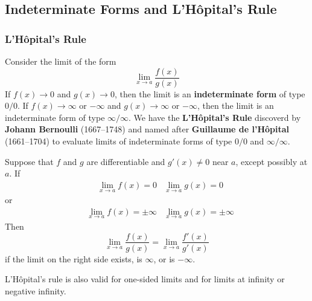 \subsection{Indeterminate Forms and L'Hôpital's Rule}
\subsubsection{L'Hôpital's Rule}
Consider the limit of the form \[\lim_{x\to a}\frac{f(x)}{g(x)}\]
If \(f(x)\to 0\) and \(g(x)\to 0\), then the limit is an
\textbf{indeterminate form} of type \(0/0\).
If \(f(x)\to\infty\) or \(-\infty\) and \(g(x)\to\infty\) or \(-\infty\),
then the limit is an indeterminate form of type \(\infty/\infty\).
We have the \textbf{L'Hôpital's Rule} discoverd by
\textbf{Johann Bernoulli} (1667--1748) and named after
\textbf{Guillaume de l'Hôpital} (1661--1704) to evaluate limits of indeterminate
forms of type \(0/0\) and \(\infty/\infty\).
\begin{theorem}
    Suppose that \(f\) and \(g\) are differentiable and \(g'(x)\neq 0\) near \(a\),
    except possibly at \(a\).
    If
    \begin{align*}
        &\lim_{x\to a}f(x)=0&\lim_{x\to a}g(x)=0
    \end{align*}
    or
    \begin{align*}
        &\lim_{x\to a}f(x)=\pm\infty&\lim_{x\to a}g(x)=\pm\infty
    \end{align*}
    Then
    \[\lim_{x\to a}\frac{f(x)}{g(x)}=\lim_{x\to a}\frac{f'(x)}{g'(x)}\]
    if the limit on the right side exists, is \(\infty\), or is \(-\infty\).
\end{theorem}
L'Hôpital's rule is also valid for one-sided limits and for limits at infinity
or negative infinity.